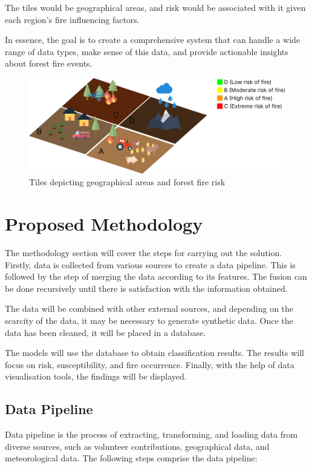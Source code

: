 The tiles would be geographical areas, and risk would be associated with it given each region's fire influencing factors.


In essence, the goal is to create a comprehensive system that can handle a wide range of data types, make sense of this data, and provide actionable insights about forest fire events.


\begin{figure}[h!]
 \centering
  \includegraphics[width=1.0\linewidth]{frontmatter/imgs/Group 1.png}
  \caption{Tiles depicting geographical areas and forest fire risk}
  \label{fig:mockup_presentation}
\end{figure}

\section{Proposed Methodology}
The methodology section will cover the steps for carrying out the solution. Firstly, data is collected from various sources to create a data pipeline. This is followed by the step of merging the data according to its features. The fusion can be done recursively until there is satisfaction with the information obtained.


The data will be combined with other external sources, and depending on the scarcity of the data, it may be necessary to generate synthetic data. Once the data has been cleaned, it will be placed in a database.


The models will use the database to obtain classification results. The results will focus on risk, susceptibility, and fire occurrence. Finally, with the help of data visualisation tools, the findings will be displayed.

\subsection{Data Pipeline} 
Data pipeline is the process of extracting, transforming, and loading data from diverse sources, such as volunteer contributions, geographical data, and meteorological data. The following steps comprise the data pipeline:

